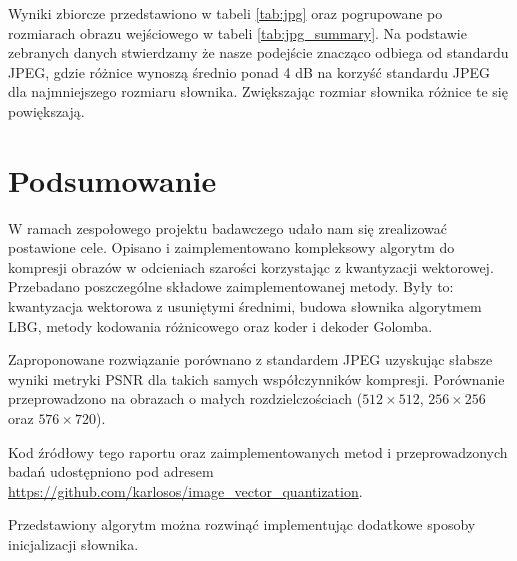 \documentclass{article}
\begin{document}
Wyniki zbiorcze przedstawiono w tabeli \ref{tab:jpg} oraz pogrupowane po rozmiarach obrazu wejściowego w tabeli \ref{tab:jpg_summary}. Na podstawie zebranych danych stwierdzamy że nasze podejście znacząco odbiega od standardu JPEG, gdzie różnice wynoszą średnio ponad 4 dB na korzyść standardu JPEG dla najmniejszego rozmiaru słownika. Zwiększając rozmiar słownika różnice te się powiększają.

\section{Podsumowanie}

W ramach zespołowego projektu badawczego udało nam się zrealizować postawione cele. Opisano i zaimplementowano kompleksowy algorytm do kompresji obrazów w odcieniach szarości korzystając z kwantyzacji wektorowej. Przebadano poszczególne składowe zaimplementowanej metody. Były to: kwantyzacja wektorowa z usuniętymi średnimi, budowa słownika algorytmem LBG, metody kodowania różnicowego oraz koder i dekoder Golomba.

Zaproponowane rozwiązanie porównano z standardem JPEG uzyskując słabsze wyniki metryki PSNR dla takich samych współczynników kompresji. Porównanie przeprowadzono na obrazach o małych rozdzielczościach ($512 \times 512$, $256 \times 256$ oraz  $576 \times 720$).

Kod źródłowy tego raportu oraz zaimplementowanych metod i przeprowadzonych badań udostępniono pod adresem \url{https://github.com/karlosos/image_vector_quantization}. 

Przedstawiony algorytm można rozwinąć implementując dodatkowe sposoby inicjalizacji słownika.


\end{document}
